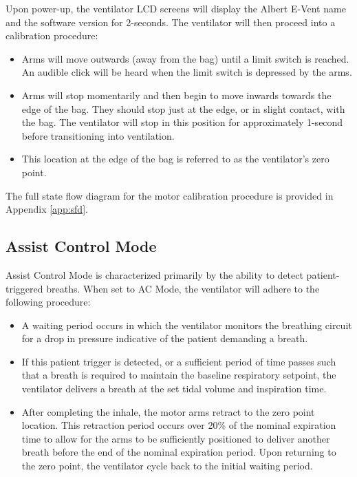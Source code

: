 \documentclass[]{article}
\begin{document}
Upon power-up, the ventilator LCD screens will display the Albert E-Vent name and the software version for 2-seconds.  The ventilator will then proceed into a calibration procedure:
\begin{itemize}
	\item Arms will move outwards (away from the bag) until a limit switch is reached.  An audible click will be heard when the limit switch is depressed by the arms.
	\item Arms will stop momentarily and then begin to move inwards towards the edge of the bag.  They should stop just at the edge, or in slight contact, with the bag.  The ventilator will stop in this position for approximately 1-second before transitioning into ventilation.
	\item This location at the edge of the bag is referred to as the ventilator's zero point.
\end{itemize}
The full state flow diagram for the motor calibration procedure is provided in Appendix \ref{app:sfd}.


\subsection{Assist Control Mode}
\label{sect:acMode}
Assist Control Mode is characterized primarily by the ability to detect patient-triggered breaths.  When set to AC Mode, the ventilator will adhere to the following procedure:
\begin{itemize}
	\item A waiting period occurs in which the ventilator monitors the breathing circuit for a drop in pressure indicative of the patient demanding a breath.
	\item If this patient trigger is detected, or a sufficient period of time passes such that a breath is required to maintain the baseline respiratory setpoint, the ventilator delivers a breath at the set tidal volume and inspiration time.
	\item After completing the inhale, the motor arms retract to the zero point location.  This retraction period occurs over 20\% of the nominal expiration time to allow for the arms to be sufficiently positioned to deliver another breath before the end of the nominal expiration period.  Upon returning to the zero point, the ventilator cycle back to the initial waiting period. 
\end{itemize}
\end{document}

